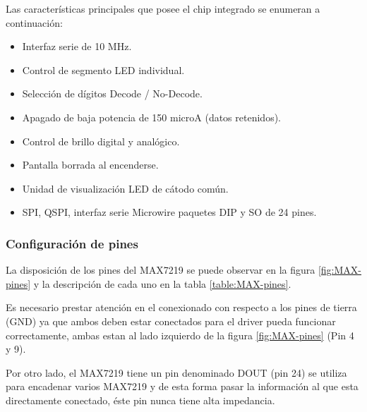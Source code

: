         Las características principales que posee el chip integrado se enumeran a continuación:
        \begin{itemize}
            \item Interfaz serie de 10 MHz.
            \item Control de segmento LED individual.
            \item Selección de dígitos Decode / No-Decode.
            \item Apagado de baja potencia de 150 microA (datos retenidos).
            \item Control de brillo digital y analógico.
            \item Pantalla borrada al encenderse.
            \item Unidad de visualización LED de cátodo común.
            \item SPI, QSPI, interfaz serie Microwire paquetes DIP y SO de 24 pines.
        \end{itemize}


        \subsubsection{Configuración de pines}
        La disposición de los pines del MAX7219 se puede observar en la figura \ref{fig:MAX-pines} y la descripción de cada uno en la tabla \ref{table:MAX-pines}.
        
        Es necesario prestar atención en el conexionado con respecto a los pines de tierra (GND) ya que ambos deben estar conectados para el driver pueda funcionar correctamente, ambas estan al lado izquierdo de la figura \ref{fig:MAX-pines} (Pin 4 y 9).
        
        Por otro lado, el MAX7219 tiene un pin denominado DOUT (pin 24) se utiliza para encadenar varios MAX7219 y de esta forma pasar la información al que esta directamente conectado, éste pin nunca tiene alta impedancia.\\
        
